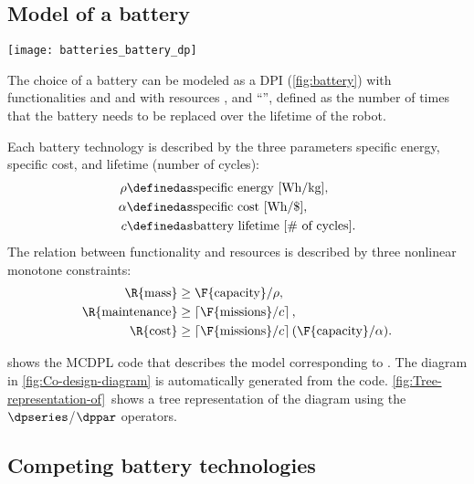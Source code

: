 \begin{figure*}[p]
\subsection{Model of a battery}
\begin{marginfigure}
    \centering
    \texttt{[image: batteries\_battery\_dp]}
    \caption{Interface of battery design problem.}
    \label{fig:battery}
\end{marginfigure}

The choice of a battery can be modeled as a DPI (\cref{fig:battery}) with functionalities  and  and with resources ,  and ``'', defined as the number of times that the battery needs to be repl\-aced over the lifetime of the robot.

Each battery technology is described by the three parameters specific energy, specific cost, and lifetime (number of cycles):
\begin{align*}
    \rho   & \definedas\text{specific energy [Wh/kg]}, \\
    \alpha & \definedas\text{specific cost [Wh/\$]}, \\
    c      & \definedas\text{battery lifetime [\# of cycles]}.
\end{align*}
The relation between functionality and resources is described by three nonlinear monotone constraints:
\begin{align}
    \R{\text{mass}}        & \geq\F{\text{capacity}}/\rho,\label{eq:mass} \\
    \R{\text{maintenance}} & \geq\left\lceil \F{\text{missions}}/c\right\rceil ,\label{eq:maintenance} \\
    \R{\text{cost}}        & \geq\left\lceil \F{\text{missions}}/c\right\rceil (\F{\text{capacity}}/\alpha).
    \label{eq:cost}
\end{align}

 shows the MCDPL code that describes the model corresponding to .
The diagram in \cref{fig:Co-design-diagram} is automatically generated from the code.
\cref{fig:Tree-representation-of}~shows a tree representation of the diagram using the $\dpseries$/$\dppar$ operators.

\subsection{Competing battery technologies}


\end{figure*}
